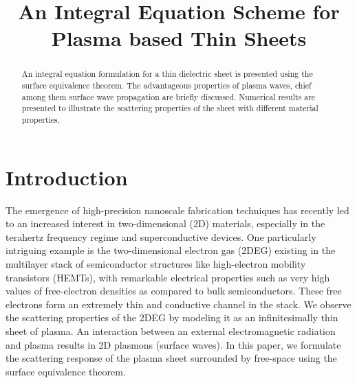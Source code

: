 \documentclass[conference, 10pt]{IEEEtran}
\renewcommand{\^}{\hat}  %
\begin{document}
\title{An Integral Equation Scheme for Plasma based Thin Sheets}


\author{
\and
{}
}
\maketitle


%
\begin{abstract}
  An integral equation formulation for a thin dielectric sheet is presented using the surface equivalence theorem. The advantageous properties of plasma waves, chief among them surface wave propagation are briefly discussed. Numerical results are presented to illustrate the scattering properties of the sheet with different material properties.
\end{abstract}

\IEEEpeerreviewmaketitle
\section{Introduction}

The emergence of high-precision nanoscale fabrication techniques has recently led to an increased interest in two-dimensional (2D) materials, especially in the terahertz frequency regime and superconductive devices. One particularly intriguing example is the two-dimensional electron gas (2DEG) existing in the multilayer stack of semiconductor structures like high-electron mobility transistors (HEMTs), with remarkable electrical properties such as very high values of free-electron densities as compared to bulk semiconductors. These free electrons form an extremely thin and conductive channel in the stack. We observe the scattering properties of the 2DEG by modeling it as an infinitesimally thin sheet of plasma. An interaction between an external electromagnetic radiation and plasma results in 2D plasmons (surface waves). In this paper, we formulate the scattering response of the plasma sheet surrounded by free-space using the surface equivalence theorem.
\end{document}

